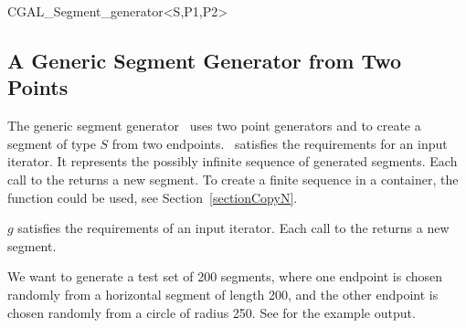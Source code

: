 \begin{ccClassTemplate}{CGAL_Segment_generator<S,P1,P2>}
\subsection{A Generic Segment Generator from Two Points}

\ccDefinition

The generic segment generator \ccClassTemplateName\ uses two point
generators  and  to create a segment of type $S$ from
two endpoints.  \ccClassTemplateName\ satisfies the requirements for
an input iterator. It represents the possibly infinite sequence of
generated segments. Each call to the  returns a new
segment. To create a finite sequence in a container, the function
 could be used, see Section~\ref{sectionCopyN}.


\ccCreation


\ccOperations

$g$ satisfies the requirements of an input iterator. Each call to the
 returns a new segment. 

\ccExample

We want to generate a test set of 200 segments, where one endpoint is
chosen randomly from a horizontal segment of length 200, and the other
endpoint is chosen randomly from a circle of radius 250. See
 for the example
output.


\end{ccClassTemplate}
